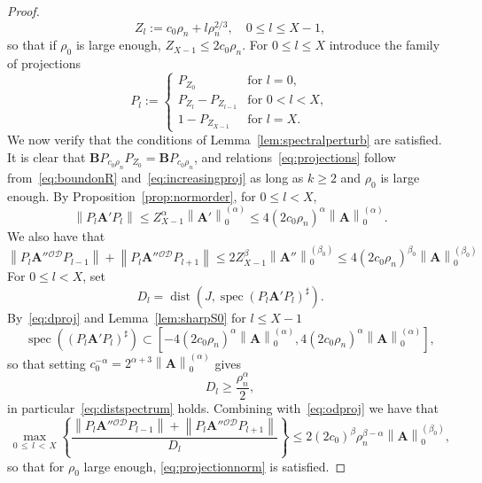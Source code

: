 \documentclass[10pt]{amsart}
\theoremstyle{definition}\newtheorem{defi}[theo]{Definition}\newtheorem{rema}[theo]{Remark}\newtheorem{exam}[theo]{Example}\newtheorem{nota}[theo]{Notation}
\DeclareMathOperator{\spec}{spec}
\DeclareMathOperator{\dist}{dist}
\newcommand{\CD}{\mathcal{D}}
\newcommand{\CO}{\mathcal{O}}
\newcommand{\BA}{\mathbf A}
\newcommand{\BB}{\mathbf B}
\newcommand{\set}[1]{\left\{ #1 \right\}}
\newcommand{\norm}[1]{\left\| #1 \right\|}
\newcommand{\snorm}[3]{\left\| #1\right\|_{#3}^{(#2)}}
\begin{document}
\begin{proof}
\begin{equation}
Z_l := c_0 \rho_n + l \rho_n^{2/3}, \quad 0 \le l \le X - 1,
\end{equation}
so that if $\rho_0$ is large enough, $Z_{X - 1} \le 2 c_0 \rho_n$. For $0 \le l \le X$ introduce the family of projections
\begin{equation}
P_l :=
\begin{cases}
P_{Z_0} & \text{for } l = 0, \\
P_{Z_l} - P_{Z_{l -1}} & \text{for } 0 < l < X, \\
1 - P_{Z_{X - 1}} & \text{for } l = X.
\end{cases}
\end{equation}
We now verify that the conditions of Lemma~\ref{lem:spectralperturb} are satisfied. It is clear that $\BB P_{c_0\rho_n} P_{Z_0} = \BB P_{c_0\rho_n}$, and relations~\eqref{eq:projections} follow from~\eqref{eq:boundonR} and~\eqref{eq:increasingproj} as long as $k
\ge 2$ and $\rho_0$ is large enough. By Proposition~\ref{prop:normorder}, for $0 \le l < X$,
\begin{equation}\label{eq:dproj}
\norm{P_l \BA' P_l} \le Z_{X-1}^\alpha \snorm{\BA'}{\alpha}{0}
\le 4(2 c_0
\rho_n)^\alpha \snorm{\BA}{\alpha}{0}.
\end{equation}
We also have that
\begin{equation}\label{eq:odproj}
\norm{P_l \BA''{}^{\CO\CD} P_{l-1}} +
\norm{P_l \BA''{}^{\CO\CD} P_{l+1}} \le 2 Z_{X-1}^{\beta}
\snorm{\BA''}{\beta_0}{0} \le 4 (2c_0\rho_n)^{\beta_0}
\snorm{\BA}{\beta_0}{0}
\end{equation}
For $0 \le l < X$, set
\begin{equation}
D_l = \dist(J,\spec(P_l \BA' P_l)^\sharp).
\end{equation}
By~\eqref{eq:dproj} and Lemma~\ref{lem:sharpS0} for $l \le X - 1$
\begin{equation}
\spec((P_l \BA' P_l)^\sharp) \subset \left[- 4(2 c_0
\rho_n)^\alpha\snorm{\BA}{\alpha}{0}, 4(2 c_0 \rho_n)^\alpha\snorm{\BA}{\alpha}{0}
\right],
\end{equation}
so that setting $ c_0^{-\alpha} = 2^{\alpha+ 3} \snorm{\BA}{\alpha}{0}$ gives
\begin{equation}
D_l \ge \frac{\rho_n^\alpha}{2},
\end{equation}
in particular~\eqref{eq:distspectrum} holds. Combining with~\eqref{eq:odproj} we have that
\begin{equation}
\max_{0\,\le\,l\,<\,X} \set{\frac{
\norm{P_l \BA''{}^{\CO\CD} P_{l-1}}+
\norm{P_l \BA''{}^{\CO\CD} P_{l+1}}}{D_l}} \le 2 (2c_0)^\beta \rho_n^{\beta -
\alpha} \snorm{\BA}{\beta_0}{0},
\end{equation}
so that for $\rho_0$ large enough, \eqref{eq:projectionnorm} is satisfied.


\end{proof}
\end{document}

